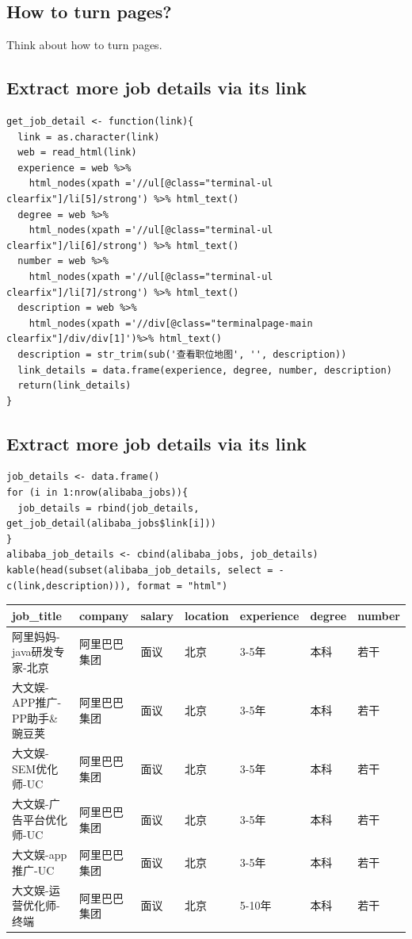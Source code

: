 \subsection{How to turn pages?}\label{how-to-turn-pages}

Think about how to turn pages.

\subsection{Extract more job details via its
link}\label{extract-more-job-details-via-its-link}

\begin{verbatim}
get_job_detail <- function(link){
  link = as.character(link)
  web = read_html(link)
  experience = web %>%
    html_nodes(xpath ='//ul[@class="terminal-ul clearfix"]/li[5]/strong') %>% html_text()
  degree = web %>%
    html_nodes(xpath ='//ul[@class="terminal-ul clearfix"]/li[6]/strong') %>% html_text()
  number = web %>%
    html_nodes(xpath ='//ul[@class="terminal-ul clearfix"]/li[7]/strong') %>% html_text()
  description = web %>%
    html_nodes(xpath ='//div[@class="terminalpage-main clearfix"]/div/div[1]')%>% html_text()
  description = str_trim(sub('查看职位地图', '', description))
  link_details = data.frame(experience, degree, number, description)
  return(link_details)
}
\end{verbatim}

\subsection{Extract more job details via its
link}\label{extract-more-job-details-via-its-link-1}

\begin{verbatim}
job_details <- data.frame()
for (i in 1:nrow(alibaba_jobs)){
  job_details = rbind(job_details, get_job_detail(alibaba_jobs$link[i]))
}
alibaba_job_details <- cbind(alibaba_jobs, job_details)
kable(head(subset(alibaba_job_details, select = -c(link,description))), format = "html")
\end{verbatim}

\begin{longtable}[]{@{}lllllll@{}}
\toprule
job\_title & company & salary & location & experience & degree &
number\tabularnewline
\midrule
\endhead
阿里妈妈-java研发专家-北京 & 阿里巴巴集团 & 面议 & 北京 & 3-5年 & 本科 &
若干\tabularnewline
大文娱-APP推广-PP助手\&豌豆荚 & 阿里巴巴集团 & 面议 & 北京 & 3-5年 &
本科 & 若干\tabularnewline
大文娱-SEM优化师-UC & 阿里巴巴集团 & 面议 & 北京 & 3-5年 & 本科 &
若干\tabularnewline
大文娱-广告平台优化师-UC & 阿里巴巴集团 & 面议 & 北京 & 3-5年 & 本科 &
若干\tabularnewline
大文娱-app推广-UC & 阿里巴巴集团 & 面议 & 北京 & 3-5年 & 本科 &
若干\tabularnewline
大文娱-运营优化师-终端 & 阿里巴巴集团 & 面议 & 北京 & 5-10年 & 本科 &
若干\tabularnewline
\bottomrule
\end{longtable}

